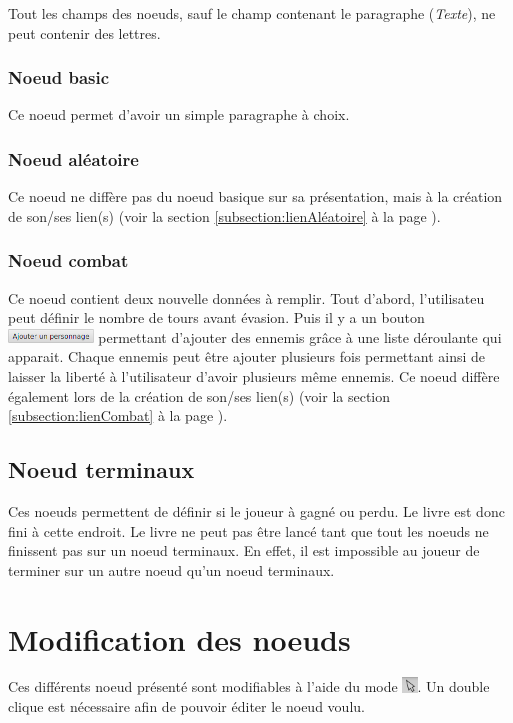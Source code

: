 			Tout les champs des noeuds, sauf le champ contenant le paragraphe (\textit{Texte}), ne peut contenir des lettres.

			\subsubsection{Noeud basic}
				Ce noeud permet d'avoir un simple paragraphe à choix.

			\subsubsection{Noeud aléatoire}
				Ce noeud ne diffère pas du noeud basique sur sa présentation, mais à la création de son/ses lien(s) (voir la section \ref{subsection:lienAléatoire} à la page \pageref{subsection:lienAléatoire}).

			\subsubsection{Noeud combat}
				Ce noeud contient deux nouvelle données à remplir. Tout d'abord, l'utilisateu peut définir le nombre de tours avant évasion. Puis il y a un bouton \includegraphics[height=10pt]{img/noeudAddPersonnage} permettant d'ajouter des ennemis grâce à une liste déroulante qui apparait. Chaque ennemis peut être ajouter plusieurs fois permettant ainsi de laisser la liberté à l'utilisateur d'avoir plusieurs même ennemis.
				Ce noeud diffère également lors de la création de son/ses lien(s) (voir la section \ref{subsection:lienCombat} à la page \pageref{subsection:lienCombat}).

		\subsection{Noeud terminaux}
			Ces noeuds permettent de définir si le joueur à gagné ou perdu. Le livre est donc fini à cette endroit. Le livre ne peut pas être lancé tant que tout les noeuds ne finissent pas sur un noeud terminaux. En effet, il est impossible au joueur de terminer sur un autre noeud qu'un noeud terminaux.

	\section{Modification des noeuds}
		Ces différents noeud présenté sont modifiables à l'aide du mode \includegraphics[height=0.4cm]{img/modeSelected.png}. Un double clique est nécessaire afin de pouvoir éditer le noeud voulu.

